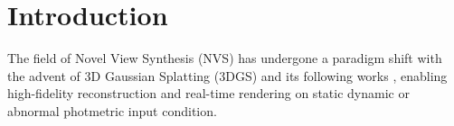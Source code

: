 \section{Introduction}
\label{sec:introduction}

\begin{table}[t]
\centering
\caption{.}
\label{tab:method_category}
\end{table}

The field of Novel View Synthesis (NVS) has undergone a paradigm shift with the advent of 3D Gaussian Splatting (3DGS) \cite{kerbl20233d} and its following works \cite{Wu_2024_CVPR, park2024splinegs, lin2025longsplat, bui2025mobgsmotiondeblurringdynamic, fu2024colmap, yu2024mip}, enabling high-fidelity reconstruction and real-time rendering on static dynamic or abnormal  photmetric input condition. 

